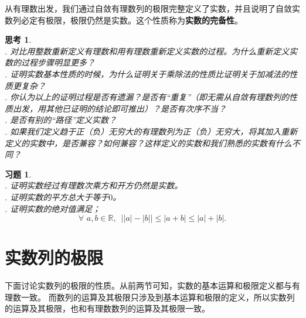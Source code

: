 \documentclass[12pt,UTF8]{ctexbook}
\newtheorem{sk}{思考}[section]
\newtheorem{xt}{习题}[section]
\begin{document}
\begin{appendix}
从有理数出发，我们通过自敛有理数列的极限完整定义了实数，并且说明了自敛实数列必定有极限，极限仍然是实数。这个性质称为\textbf{实数的完备性}。

\begin{sk}
    \mbox{} \\
    . 对比用整数重新定义有理数和用有理数重新定义实数的过程。为什么重新定义实数的过程步骤明显更多？\\
    . 证明实数基本性质的时候，为什么证明关于乘除法的性质比证明关于加减法的性质更复杂？\\
    . 你认为以上的证明过程是否有遗漏？是否有“重复”（即无需从自敛有理数列的性质出发，用其他已证明的结论即可推出）？是否有次序不当？\\
    . 是否有别的“路径”定义实数？\\
    . 如果我们定义趋于正（负）无穷大的有理数列为正（负）无穷大，将其加入重新定义的实数中，是否兼容？如何兼容？这样定义的实数和我们熟悉的实数有什么不同？
\end{sk} 

\begin{xt}
    \mbox{} \\
    . 证明实数经过有理数次乘方和开方仍然是实数。\\
    . 证明实数的平方总大于等于$0$。\\
    . 证明实数的绝对值满足；
    $$\forall \,\, a, b\in\mathbb{R}, \,\,\, \big||a| - |b|\big| \leqslant |a + b| \leqslant |a| + |b|.$$
\end{xt}

\section{实数列的极限}
下面讨论实数列的极限的性质。从前两节可知，实数的基本运算和极限定义都与有理数一致。
而数列的运算及其极限只涉及到基本运算和极限的定义，所以实数列的运算及其极限，也和有理数数列的运算及其极限一致。


\end{appendix}
\end{document}
